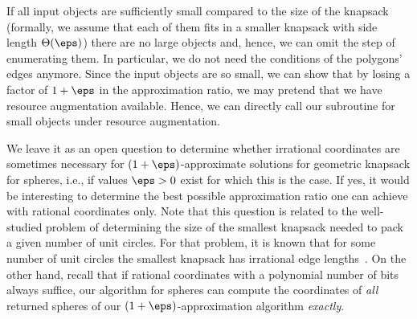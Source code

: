 {If all input objects are sufficiently small compared to the size of the knapsack (formally, we assume that each of them
fits in a smaller knapsack with side length $\Theta(\eps)$)
there are no large objects and, hence,
we can omit the step of enumerating them. In particular, we do not
need the conditions of the polygons' edges anymore.
Since the input objects are so small,
we can show that by losing a factor of $1+\eps$ in the approximation ratio,
we may pretend that we have resource augmentation available.
Hence, we can directly call our subroutine for small objects under resource augmentation.

We leave it as an open question to determine whether irrational coordinates
are sometimes necessary for $(1+\eps)$-approximate 
solutions for geometric knapsack for spheres, i.e., if values $\eps>0$ exist for which this is the case.
If yes, it would be
interesting to determine the best possible approximation ratio one
can achieve with rational coordinates only. Note that this question
is related to the well-studied problem of determining the size of
the smallest knapsack needed to pack a given number of unit circles.
For that problem, it is known that for some number of unit circles
the smallest knapsack has irrational edge lengths~\cite{friedman-cirinsqu}.
On the other hand, recall that if rational coordinates with a polynomial number of bits
always suffice, our algorithm for spheres can compute the coordinates
of \emph{all} returned spheres of our $(1+\eps)$-approximation algorithm
\emph{exactly}.

}
